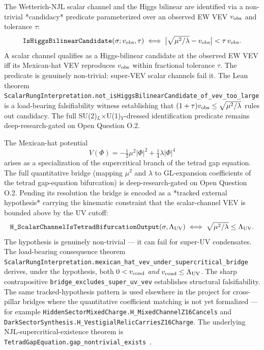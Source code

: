 \documentclass[aps,prd,twocolumn,showpacs,superscriptaddress,nofootinbib]{revtex4-2}
\newcommand{\HiggsField}{\Phi}
\newcommand{\WetterichScalar}{\sigma}
\begin{document}
The Wetterich-NJL scalar channel and the Higgs bilinear are identified
via a non-trivial *candidacy* predicate parameterized over an observed
EW VEV $v_{\rm obs}$ and tolerance $\tau$:
\begin{equation}
\texttt{IsHiggsBilinearCandidate}(\WetterichScalar; v_{\rm obs}, \tau) \iff
\bigl|\sqrt{\mu^2/\lambda} - v_{\rm obs}\bigr| < \tau\,v_{\rm obs}.
\end{equation}
A scalar channel qualifies as a Higgs-bilinear candidate at the
observed EW VEV iff its Mexican-hat VEV reproduces $v_{\rm obs}$ within
fractional tolerance $\tau$. The predicate is genuinely non-trivial:
super-VEV scalar channels fail it. The Lean theorem
\texttt{ScalarRungInterpretation.not\_isHiggsBilinearCandidate\_of\_vev\_too\_large}
is a load-bearing falsifiability witness establishing that
$(1+\tau)v_{\rm obs} \le \sqrt{\mu^2/\lambda}$ rules out candidacy.
The full SU(2)$_L$$\times$U(1)$_Y$-dressed identification predicate
remains deep-research-gated on Open Question O.2.

The Mexican-hat potential
\begin{equation}
\label{eq:mexican-hat}
V(\HiggsField) = -\tfrac{1}{2}\mu^2 |\HiggsField|^2 +
\tfrac{1}{4}\lambda |\HiggsField|^4
\end{equation}
arises as a specialization of the supercritical branch of the tetrad
gap equation. The full quantitative bridge (mapping $\mu^2$ and $\lambda$
to GL-expansion coefficients of the tetrad gap-equation bifurcation) is
deep-research-gated on Open Question O.2. Pending its resolution the
bridge is encoded as a *tracked external hypothesis* carrying the
kinematic constraint that the scalar-channel VEV is bounded above by
the UV cutoff:
\begin{equation}
\texttt{H\_ScalarChannelIsTetradBifurcationOutput}(\WetterichScalar, \Lambda_{\rm UV}) \iff
\sqrt{\mu^2/\lambda} \le \Lambda_{\rm UV}.
\end{equation}
The hypothesis is genuinely non-trivial — it can fail for super-UV
condensates. The load-bearing consequence theorem
\texttt{ScalarRungInterpretation.mexican\_hat\_vev\_under\_supercritical\_bridge}
derives, under the hypothesis, both $0 < v_{\rm cond}$ \emph{and}
$v_{\rm cond} \le \Lambda_{\rm UV}$. The sharp contrapositive
\texttt{bridge\_excludes\_super\_uv\_vev} establishes structural
falsifiability. The same tracked-hypothesis pattern is used elsewhere
in the project for cross-pillar bridges where the quantitative coefficient
matching is not yet formalized — for example
\texttt{HiddenSectorMixedCharge.H\_MixedChannelZ16Cancels} and
\texttt{DarkSectorSynthesis.H\_VestigialRelicCarriesZ16Charge}. The
underlying NJL-supercritical-existence theorem is
\texttt{TetradGapEquation.gap\_nontrivial\_exists}~\cite{NJL61,GiesScherer}.
\end{document}
